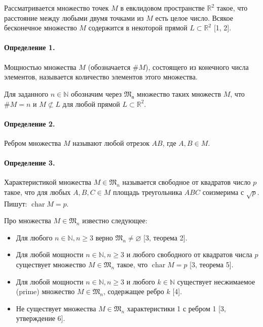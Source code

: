 




\vzmscaption

Рассматривается множество точек $M$ в евклидовом пространстве $\mathbb{R}^{2}$ такое, что расстояние между любыми двумя точками из $M$ есть целое число. Всякое бесконечное множество $M$ содержится в некоторой прямой $L \subset \mathbb{R}^2$ [1, 2].

\paragraph{Определение 1.}
Мощностью множества $M$ (обозначается $\#M$), состоящего из конечного
числа элементов, называется количество элементов этого множества.

Для заданного $n \in \mathbb{N}$ обозначим через $\mathfrak{M_n}$ множество таких множеств $M$, что  $\#M=n$ и $M \not \subset L$ для любой прямой $L \subset \mathbb{R}^{2}$.

\paragraph{Определение 2.}
Ребром множества $M$ называют любой отрезок $AB$, где $A, B \in M$.

\paragraph{Определение 3.}
Характеристикой множества $M \in \mathfrak{M}_{n}$ называется свободное от квадратов число $p$ такое,
что для любых $A, B, C \in M$ площадь треугольника $ABC$ соизмерима с $\sqrt{p}$.
Пишут: $\operatorname{char}{M}={p}$.


Про множества $M \in \mathfrak{M}_{n}$ известно следующее:
\begin{itemize}
	\item
		Для любого $n \in \mathbb{N}, n \geq 3$ верно $\mathfrak{M}_{n} \neq \varnothing$ [3, теорема 2].

	\item
		Для любой мощности $n \in \mathbb{N}, n \geq 3$ и любого свободного от квадратов числа $p$ существует множество $M \in \mathfrak{M}_{n}$ такое, что $\operatorname{char}{M}={p}$ [3, теорема 5].
	\item
		Для любой мощности $n \in \mathbb{N}, n \geq 3$ и любого $k \in \mathbb{N}$ существует несжимаемое \foreignlanguage{english}{(prime)} множество $M \in \mathfrak{M}_{n}$, содержащее ребро ${k}$ [4].
	\item
		Не существует множества $M \in \mathfrak{M}_{n}$ характеристики 1 с ребром 1 [3, утверждение 6].
\end{itemize}

